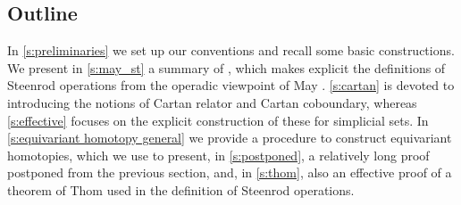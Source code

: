 
\subsection*{Outline}

In \cref{s:preliminaries} we set up our conventions and recall some basic constructions.
We present in \cref{s:may_st} a summary of \cite{medina2021may_st}, which makes explicit the definitions of Steenrod operations \cite{steenrod1953cyclic} from the operadic viewpoint of May \cite{may1970general}.
\cref{s:cartan} is devoted to introducing the notions of Cartan relator and Cartan coboundary, whereas \cref{s:effective} focuses on the explicit construction of these for simplicial sets.
In \cref{s:equivariant homotopy general} we provide a procedure to construct equivariant homotopies, which we use to present, in \cref{s:postponed}, a relatively long proof postponed from the previous section, and, in \cref{s:thom}, also an effective proof of a theorem of Thom used in the definition of Steenrod operations.